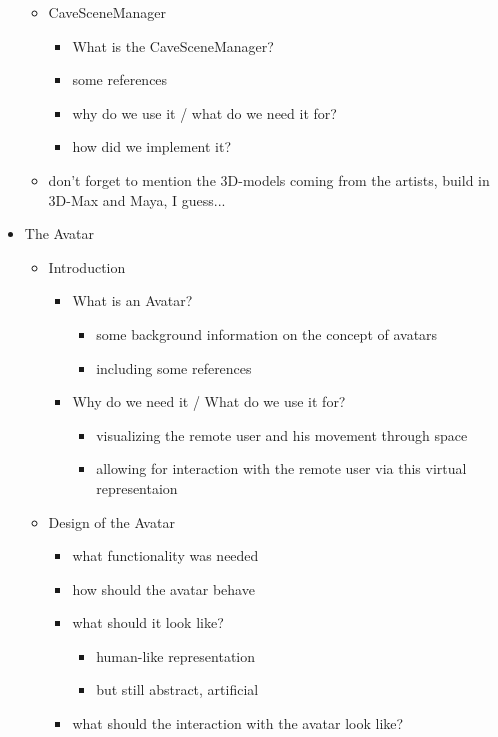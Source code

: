 \documentclass[conference]{acmsiggraph}
\begin{document}
\begin{itemize}
{\begin{itemize}
{\begin{itemize}
{		}
		\item How is it implemented?
		\end{itemize}
	}
	\item{CaveSceneManager
		\begin{itemize}
		\item What is the CaveSceneManager?
		\item some references
		\item why do we use it / what do we need it for?
		\item how did we implement it?
		\end{itemize}
	}
	\item don't forget to mention the 3D-models coming from the artists, build in 3D-Max and Maya, I guess...
	\end{itemize}
}
\item{The Avatar
	\begin{itemize}
	\item{Introduction
		\begin{itemize}
		\item{What is an Avatar?
			\begin{itemize}
			\item some background information on the concept of avatars
			\item including some references
			\end{itemize}
		}
		\item{Why do we need it / What do we use it for?
			\begin{itemize}
			\item visualizing the remote user and his movement through space
			\item allowing for interaction with the remote user via this virtual representaion
			\end{itemize}
		}
		\end{itemize}			
	}
	\item{Design of the Avatar
		\begin{itemize}
		\item what functionality was needed
		\item how should the avatar behave
		\item{what should it look like?
			\begin{itemize}
			\item human-like representation
			\item but still abstract, artificial
			\end{itemize}
		}
		\item{what should the interaction with the avatar look like?
}
\end{itemize}}
\end{itemize}}
\end{itemize}
\end{document}
